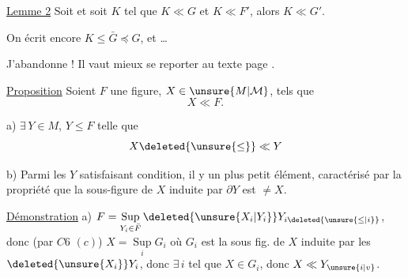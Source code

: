 
\uline{Lemme 2} Soit
et soit $K$ tel que $K\ll G$ et $K\ll F'$, alors $K\ll G'$.

On écrit encore $K\leq\bar G\preceq G$, et \ldots

 J'abandonne ! Il vaut mieux se reporter au texte page .




\uline{Proposition} Soient $F$ une figure, $X\in\unsure{M|\mathcal M}$, tels que
\[
 X\ll F.
\]

a)  $\exists\,Y\in M$, $Y\leq F$ telle que
\[
 X\deleted{\unsure{\leq}}\ll Y
\]

b) Parmi les $Y$ satisfaisant  condition, il y un plus petit élément,     caractérisé par la propriété que la sous-figure de $X$ induite par $\partial Y$ est $\neq X$.

\uline{Démonstration} a) $F=\mathop{\mathrm{Sup}}\limits_{Y_i\in\bar F}\deleted{\unsure{X_i|Y_i}}Y_{i\deleted{\unsure{\leq|i}}}$, donc  (par $C6$ $(c)$) $X=\mathop{\mathrm{Sup}}\limits_{i}G_i$ où $G_i$ est la sous fig. de $X$ induite par les $\deleted{\unsure{X_i}}Y_i$, donc $\exists\,i$ tel que $X\in G_i$, donc $X\ll Y_{\unsure{i|v}}$.
